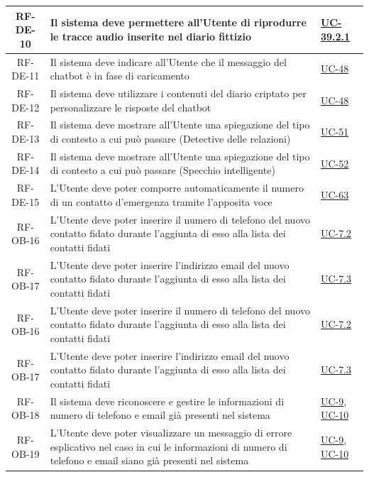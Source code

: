 \documentclass[a4paper,12pt]{article}
\begin{document}
\begin{center}
\begin{longtable}{|c|p{8.5cm}|>{\centering\arraybackslash}p{4cm}|}
\hline
\rowcolor{gray!20}
RF-DE-10 & Il sistema deve permettere all'Utente di riprodurre le tracce audio inserite nel diario fittizio & \hyperref[subsec:UC-39.2.1]{UC-39.2.1} \\
\hline
\rowcolor{white}
RF-DE-11 & Il sistema deve indicare all'Utente che il messaggio del chatbot è in fase di caricamento & \hyperref[sec:UC-48]{UC-48} \\
\hline
\rowcolor{gray!20}
RF-DE-12 & Il sistema deve utilizzare i contenuti del diario criptato per personalizzare le risposte del chatbot & \hyperref[sec:UC-48]{UC-48} \\
\hline
\rowcolor{white}
RF-DE-13 & Il sistema deve mostrare all'Utente una spiegazione del tipo di contesto a cui può passare (Detective delle relazioni) & \hyperref[sec:UC-51]{UC-51} \\
\hline
\rowcolor{gray!20}
RF-DE-14 & Il sistema deve mostrare all'Utente una spiegazione del tipo di contesto a cui può passare (Specchio intelligente) & \hyperref[sec:UC-52]{UC-52} \\
\hline
\rowcolor{white}
RF-DE-15 & L'Utente deve poter comporre automaticamente il numero di un contatto d'emergenza tramite l'apposita voce & \hyperref[sec:UC-63]{UC-63} \\
\hline
\rowcolor{gray!20}
RF-OB-16 & L'Utente deve poter inserire il numero di telefono del nuovo contatto fidato durante l'aggiunta di esso alla lista dei contatti fidati & \hyperref[subsec:UC-7.2]{UC-7.2} \\
\hline
\rowcolor{white}
RF-OB-17 & L'Utente deve poter inserire l'indirizzo email del nuovo contatto fidato durante l'aggiunta di esso alla lista dei contatti fidati & \hyperref[subsec:UC-7.3]{UC-7.3} \\
\rowcolor{gray!20}
RF-OB-16 & L'Utente deve poter inserire il numero di telefono del nuovo contatto fidato durante l'aggiunta di esso alla lista dei contatti fidati & \hyperref[subsec:UC-7.2]{UC-7.2} \\
\hline
\rowcolor{white}
RF-OB-17 & L'Utente deve poter inserire l'indirizzo email del nuovo contatto fidato durante l'aggiunta di esso alla lista dei contatti fidati & \hyperref[subsec:UC-7.3]{UC-7.3} \\
\hline
\rowcolor{gray!20}
RF-OB-18 & Il sistema deve riconoscere e gestire le informazioni di numero di telefono e email già presenti nel sistema & \hyperref[subsec:UC-9]{UC-9}, \hyperref[subsec:UC-10]{UC-10} \\
\hline
\rowcolor{white}
RF-OB-19 & L'Utente deve poter visualizzare un messaggio di errore esplicativo nel caso in cui le informazioni di numero di telefono e email siano già presenti nel sistema & \hyperref[subsec:UC-9]{UC-9}, \hyperref[subsec:UC-10]{UC-10} \\

\end{longtable}
\end{center}
\end{document}
